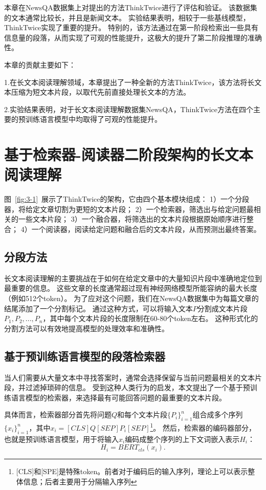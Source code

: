 本章在NewsQA数据集\cite{trischler2016newsqa}上对提出的方法ThinkTwice进行了评估和验证。
该数据集的文本通常比较长，并且是新闻文本。
实验结果表明，相较于一些基线模型\cite{devlin2018bert,joshi2020spanbert,tay2018densely}，ThinkTwice实现了重要的提升。
特别的，该方法通过在第一阶段检索出一些具有信息量的段落，从而实现了可观的性能提升，这极大的提升了第二阶段推理的准确性。

本章的贡献主要如下：

1.在长文本阅读理解领域，本章提出了一种全新的方法ThinkTwice，该方法将长文本压缩为短文本片段，以取代先前直接处理长文本的方法。

2.实验结果表明，对于长文本阅读理解数据集NewsQA\cite{trischler2016newsqa}，ThinkTwice方法在四个主要的预训练语言模型\cite{devlin2018bert,liu2019roberta,lan2019albert,joshi2020spanbert}中均取得了可观的性能提升。


\section{基于检索器-阅读器二阶段架构的长文本阅读理解}
图~\ref{fig:3-1}~展示了ThinkTwice的架构，它由四个基本模块组成：
1）一个分段器，将给定文章切割为更短的文本片段；
2）一个检索器，筛选出与给定问题最相关的一些文本片段；
3）一个融合器，将筛选出的文本片段根据原始顺序进行整合；
4）一个阅读器，阅读给定问题和融合后的文本片段，从而预测出最终答案。



\subsection{分段方法}
长文本阅读理解的主要挑战在于如何在给定文章中的大量知识片段中准确地定位到最重要的信息。
这些文章的长度通常超过现有神经网络模型所能容纳的最大长度（例如512个token）。
为了应对这个问题，我们在NewsQA数据集中为每篇文章的结尾添加了一个分割标记。
通过这种方式，可以将输入文本$P$分割成文本片段$P_1,P_2,...,P_n$，其中每个文本片段的长度限制在60-80个token左右。
这种形式化的分割方法可以有效地提高模型的处理效率和准确性。

\subsection{基于预训练语言模型的段落检索器}
当人们需要从大量文本中寻找答案时，通常会选择保留与当前问题最相关的文本片段，并过滤掉琐碎的信息。
受到这种人类行为的启发，本文提出了一个基于预训练语言模型的检索器，来选择最有可能回答问题的最重要的文本片段。

具体而言，检索器部分首先将问题$Q$和每个文本片段$\{P_i\}^n_{i=1}$组合成多个序列$\{x_i\}^n_{i=1}$，其中$x_i=[CLS]Q[SEP]P_i[SEP]$\footnote{[CLS]和[SPE]是特殊token。前者对于编码后的输入序列，理论上可以表示整体信息；后者主要用于分隔输入序列}。
然后，检索器的编码器部分，也就是预训练语言模型，用于将输入$x_i$编码成整个序列的上下文词嵌入表示$H_i$：
\begin{equation}
    H_i = BERT_{cls}(x_i).
\end{equation}

